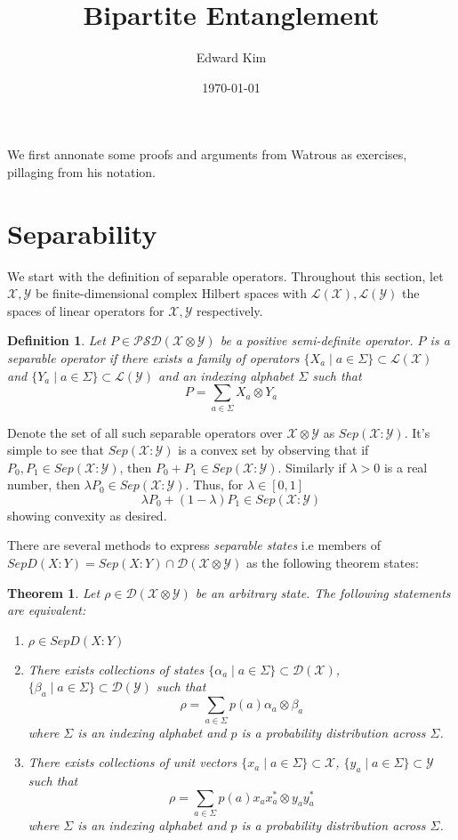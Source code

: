 \documentclass[12pt]{article}
\newcommand{\X}{\mathcal{X}}
\newcommand{\Y}{\mathcal{Y}}
\newcommand{\LX}{\mathcal{L}(\mathcal{X})}
\newcommand{\LY}{\mathcal{L}(\mathcal{Y})}
\newcommand{\DX}{\mathcal{D}(\mathcal{X})}
\newcommand{\DY}{\mathcal{D}(\mathcal{Y})}
\newtheorem{definition}{Definition}
\newtheorem{theorem}{Theorem}
\begin{document}
\title{Bipartite Entanglement}
\author{Edward Kim}
\date{\today}
\maketitle

We first annonate some proofs and arguments from Watrous as exercises, pillaging from his notation.

\section{Separability}
We start with the definition of separable operators. Throughout this section, let $\X,\Y$ be finite-dimensional complex Hilbert spaces with $\mathcal{L}(\mathcal{X}), \mathcal{L}(\mathcal{Y})$ the spaces of linear operators for $\mathcal{X},\mathcal{Y}$ respectively.
\begin{definition}
Let $P \in \mathcal{PSD}(\X \otimes \Y)$ be a positive semi-definite operator. $P$ is a \emph{separable operator} if there exists a family of operators $\{X_a \mid a \in \Sigma \} \subset \LX$ and $\{Y_a \mid a \in \Sigma \} \subset \LY$ and an indexing alphabet $\Sigma$ such that
\[
P = \sum_{a \in \Sigma} X_a \otimes Y_a
\]
\end{definition}
Denote the set of all such separable operators over $\X \otimes \Y$ as $Sep(\X:\Y)$.
It's simple to see that $Sep(\X:\Y)$ is a convex set by observing that if $P_0, P_1 \in Sep(\X : \Y)$, then $P_0 + P_1 \in Sep(\X: \Y)$. Similarly if $\lambda > 0$ is a real number, then $\lambda P_0 \in Sep(\X : \Y)$. Thus, for $\lambda \in [0,1]$
\[
\lambda P_0 + (1-\lambda)P_1 \in Sep(\X : \Y)
\]
showing convexity as desired.

There are several methods to express \emph{separable states} i.e members of $SepD(X : Y) = Sep(X:Y) \cap \mathcal{D}(\X \otimes \Y)$ as the following theorem states:
\begin{theorem}
  Let $\rho \in \mathcal{D}(\X \otimes \Y)$ be an arbitrary state. The following statements are equivalent:
  \begin{enumerate}
    \item $\rho \in SepD(X : Y)$
    \item There exists collections of states $\{\alpha_a \mid a \in \Sigma\} \subset \DX$, $\{\beta_a \mid a \in \Sigma\} \subset \DY$ such that
    \[
      \rho = \sum_{a \in \Sigma} p(a) \alpha_a \otimes \beta_a
    \]
    where $\Sigma$ is an indexing alphabet and $p$ is a probability distribution across $\Sigma$.
    \item There exists collections of unit vectors $\{x_a \mid a \in \Sigma\} \subset \X$, $\{y_a \mid a \in \Sigma\} \subset \Y$ such that
    \[
    \rho = \sum_{a \in \Sigma} p(a) x_ax_a^* \otimes y_ay_a^*
    \]
    where $\Sigma$ is an indexing alphabet and $p$ is a probability distribution across $\Sigma$.
  \end{enumerate}
\end{theorem}
\end{document}
